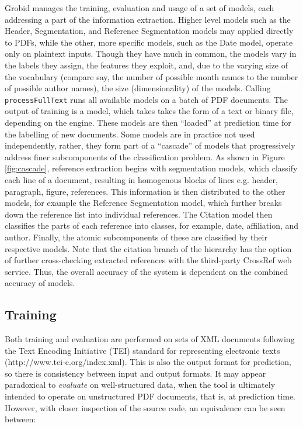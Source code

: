 \documentclass[11pt, oneside]{scrartcl}   	%
\begin{document}
Grobid manages the training, evaluation and usage of a set of models, each addressing a part of the information extraction. Higher level models such as the Header, Segmentation, and Reference Segmentation models may applied directly to PDFs, while the other, more specific models, such as the Date model, operate only on plaintext inputs. Though they have much in common, the models vary in the labels they assign, the features they exploit, and, due to the varying size of the vocabulary (compare say, the number of possible month names to the number of possible author names), the size (dimensionality) of the models. Calling \texttt{processFullText} runs all available models on a batch of PDF documents. The output of training is a model, which takes takes the form of a text or binary file, depending on the engine. These models are then ``loaded'' at prediction time for the labelling of new documents. Some models are in practice not used independently, rather, they form part of a ``cascade'' of models that progressively address finer subcomponents of the classification problem. As shown in Figure \ref{fig:cascade}, reference extraction begins with segmentation models, which classify each line of a document, resulting in homogenous blocks of lines e.g. header, paragraph, figure, references. This information is then distributed to the other models, for example the Reference Segmentation model, which further breaks down the reference list into individual references. The Citation model then classifies the parts of each reference into classes, for example, date, affiliation, and author. Finally, the atomic subcomponents of these are classified by their respective models. Note that the citation branch of the hierarchy has the option of further cross-checking extracted references with the third-party CrossRef web service. Thus, the overall accuracy of the system is dependent on the combined accuracy of models.

\subsection{Training}

Both training and evaluation are performed on sets of XML documents following the Text Encoding Initiative (TEI) standard for representing electronic texts (http://www.tei-c.org/index.xml). This is also the output format for prediction, so there is consistency between input and output formats. It may appear paradoxical to \emph{evaluate} on well-structured data, when the tool is ultimately intended to operate on unstructured PDF documents, that is, at prediction time. However, with closer inspection of the source code, an equivalence can be seen between:
\end{document}
